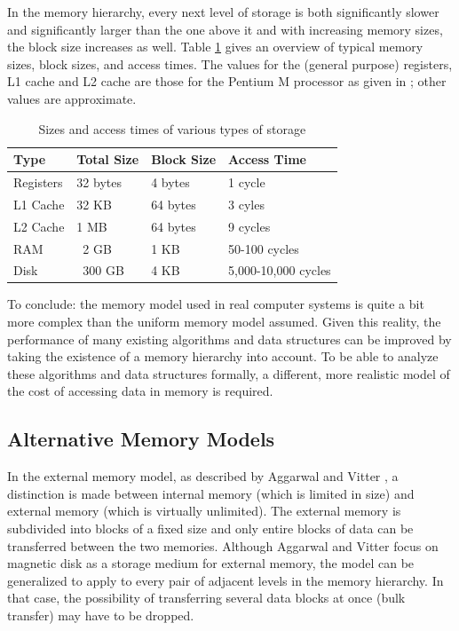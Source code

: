 \documentclass{acm_proc_article-sp}
\begin{document}
In the memory hierarchy, every next level of storage is both significantly slower and significantly larger than the one above it and with increasing memory sizes, the block size increases as well. Table \ref{tab-memhier} gives an overview of typical memory sizes, block sizes, and access times. The values for the (general purpose) registers, L1 cache and L2 cache are those for the Pentium M processor as given in \cite{intel-opt}; other values are approximate.

\begin{table}
\begin{center}
\begin{tabular}{ l l l l }
\hline
\textbf{Type} & \textbf{Total Size} & \textbf{Block Size} & \textbf{Access Time} \\
\hline
Registers  &   32 bytes & 4 bytes & 1 cycle \\
L1 Cache   &   32 KB    & 64 bytes & 3 cyles \\
L2 Cache   &    1 MB    & 64 bytes & 9 cycles \\
RAM        &   ~2 GB    & 1 KB     & 50-100 cycles \\
Disk       & ~300 GB    & 4 KB     & 5,000-10,000 cycles \\
\hline
\end{tabular}
\caption{Sizes and access times of various types of storage}
\label{tab-memhier}
\end{center}
\end{table}


To conclude: the memory model used in real computer systems is quite a bit more complex than the uniform memory model assumed. Given this reality, the performance of many existing algorithms and data structures can be improved by taking the existence of a memory hierarchy into account. To be able to analyze these algorithms and data structures formally, a different, more realistic model of the cost of accessing data in memory is required.

\subsection{Alternative Memory Models}
In the external memory model, as described by Aggarwal and Vitter \cite{aggarwal1988ioc}, a distinction is made between internal memory (which is limited in size) and external memory (which is virtually unlimited). The external memory is subdivided into blocks of a fixed size and only entire blocks of data can be transferred between the two memories. Although Aggarwal and Vitter focus on magnetic disk as a storage medium for external memory, the model can be generalized to apply to every pair of adjacent levels in the memory hierarchy. In that case, the possibility of transferring several data blocks at once (bulk transfer) may have to be dropped.
\end{document}
